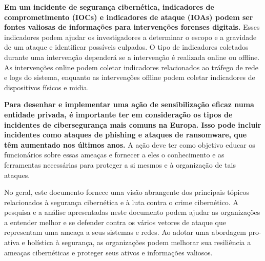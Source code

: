 \textbf{Em um incidente de segurança cibernética, indicadores de comprometimento (IOCs) e indicadores de ataque (IOAs) podem ser fontes valiosas de informações para intervenções forenses digitais.} Esses indicadores podem ajudar os investigadores a determinar o escopo e a gravidade de um ataque e identificar possíveis culpados. O tipo de indicadores coletados durante uma intervenção dependerá se a intervenção é realizada online ou offline. As intervenções online podem coletar indicadores relacionados ao tráfego de rede e logs do sistema, enquanto as intervenções offline podem coletar indicadores de dispositivos físicos e midia.

\textbf{Para desenhar e implementar uma ação de sensibilização eficaz numa entidade privada, é importante ter em consideração os tipos de incidentes de cibersegurança mais comuns na Europa. Isso pode incluir incidentes como ataques de phishing e ataques de ransomware, que têm aumentado nos últimos anos.} A ação deve ter como objetivo educar os funcionários sobre essas ameaças e fornecer a eles o conhecimento e as ferramentas necessárias para proteger a si mesmos e à organização de tais ataques.

No geral, este documento fornece uma visão abrangente dos principais tópicos relacionados à segurança cibernética e à luta contra o crime cibernético. A pesquisa e a análise apresentadas neste documento podem ajudar as organizações a entender melhor e se defender contra os vários vetores de ataque que representam uma ameaça a seus sistemas e redes. Ao adotar uma abordagem pro-ativa e holística à segurança, as organizações podem melhorar sua resiliência a ameaças cibernéticas e proteger seus ativos e informações valiosos.

\newpage
